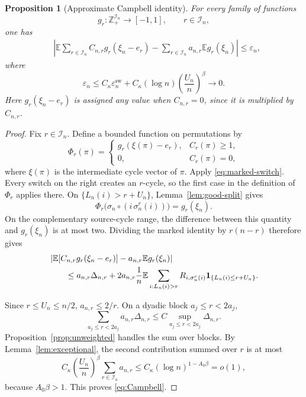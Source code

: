 \documentclass[11pt]{article}
\newtheorem{proposition}[theorem]{Proposition}
\theoremstyle{definition}
\theoremstyle{remark}
\newcommand{\Ee}{\mathbb E}
\newcommand{\one}{\mathbf 1}
\newcommand{\cI}{\mathcal I}
\newcommand{\Z}{\mathbb Z}
\begin{document}
\begin{proposition}[Approximate Campbell identity]
\label{prop:Campbell}
For every family of functions
\[
 g_r:\Z_+^{\cI_n}\to[-1,1],
 \qquad r\in\cI_n,
\]
one has
\begin{align}
 &\left|
 \Ee\sum_{r\in\cI_n}C_{n,r}g_r(\xi_n-e_r)
 -\sum_{r\in\cI_n}a_{n,r}\Ee g_r(\xi_n)
 \right|
 \le\varepsilon_n,
 \label{eq:Campbell}
\end{align}
where
\begin{equation}\label{eq:epsilon-n}
 \varepsilon_n
 \le C_\kappa\varepsilon_n^{\mathrm{sw}}
 +C_\kappa(\log n)\left(\frac{U_n}{n}\right)^\beta
 \longrightarrow0.
\end{equation}
Here $g_r(\xi_n-e_r)$ is assigned any value when $C_{n,r}=0$, since it is
multiplied by $C_{n,r}$.
\end{proposition}

\begin{proof}
Fix $r\in\cI_n$.  Define a bounded function on permutations by
\[
 \Phi_r(\pi)=
 \begin{cases}
 g_r(\xi(\pi)-e_r),&C_r(\pi)\ge1,\\
 0,&C_r(\pi)=0,
 \end{cases}
\]
where $\xi(\pi)$ is the intermediate cycle vector of $\pi$.  Apply
\eqref{eq:marked-switch}.  Every switch on the right creates an $r$-cycle,
so the first case in the definition of $\Phi_r$ applies there.  On
$\{L_n(i)>r+U_n\}$, Lemma~\ref{lem:good-split} gives
\[
 \Phi_r\bigl(\sigma_n\circ(i\,\sigma_n^r(i))\bigr)
 =g_r(\xi_n).
\]
On the complementary source-cycle range, the difference between this
quantity and $g_r(\xi_n)$ is at most two.  Dividing the marked identity by
$r(n-r)$ therefore gives
\begin{align}
 &\left|
 \Ee[C_{n,r}g_r(\xi_n-e_r)]
 -a_{n,r}\Ee g_r(\xi_n)
 \right|
 \notag\\
 &\qquad\le
 a_{n,r}\Delta_{n,r}
 +2a_{n,r}
 \frac1n\Ee\sum_{i:L_n(i)>r}
 R_{i,\sigma_n^r(i)}
 \one_{\{L_n(i)\le r+U_n\}}.
 \label{eq:Campbell-one-r}
\end{align}

Since $r\le U_n\le n/2$, $a_{n,r}\le2/r$.  On a dyadic block
$a_j\le r<2a_j$,
\[
 \sum_{a_j\le r<2a_j}a_{n,r}\Delta_{n,r}
 \le C\sup_{a_j\le r<2a_j}\Delta_{n,r}.
\]
Proposition~\ref{prop:unweighted} handles the sum over blocks.  By
Lemma~\ref{lem:exceptional}, the second contribution summed over $r$ is at
most
\[
 C_\kappa\left(\frac{U_n}{n}\right)^\beta
 \sum_{r\in\cI_n}a_{n,r}
 \le C_\kappa(\log n)^{1-A_0\beta}=o(1),
\]
because $A_0\beta>1$.  This proves \eqref{eq:Campbell}.
\end{proof}
\end{document}
